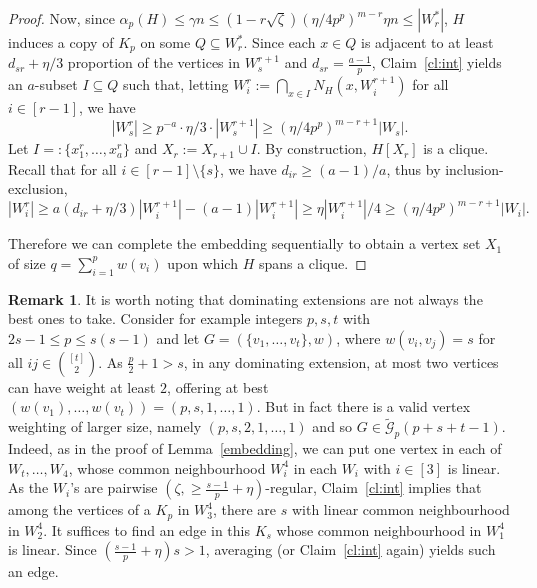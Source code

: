 \documentclass[10pt,a4paper]{article}
\theoremstyle{definition}
\newtheorem{remark}[theorem]{Remark}
\newcommand{\cG}{\mathcal{G}}
\begin{document}
\begin{proof}
	Now, since $\alpha_p(H) \leq \gamma n \leq (1-r\sqrt{\zeta})(\eta/4p^p)^{m-r}\eta n \leq |W^*_r|$, $H$ induces a copy of $K_{p}$ on some $Q\subseteq W_r^*$. Since each $x\in Q$ is adjacent to at least $d_{sr}+\eta/3$ proportion of the vertices in $W_s^{r+1}$ and $d_{sr}=\frac{a-1}{p}$, Claim~\ref{cl:int} yields an $a$-subset $I\subseteq Q$ such that, letting $W_i^r := \bigcap_{x \in I}N_H(x,W_i^{r+1})$ for all $i \in [r-1]$, we have 
	$$|W_s^r| \geq p^{-a}\cdot\eta/3\cdot|W_s^{r+1}| \geq (\eta/4p^p)^{m-r+1}|W_s|.$$
	Let $I =: \lbrace x^r_1,\ldots,x^r_{a}\rbrace$ and $X_r := X_{r+1}\cup I$.
	By construction, $H[X_r]$ is a clique.
	Recall that for all $i \in [r-1]\setminus\lbrace s\rbrace$, we have $d_{ir} \geq (a-1)/a$,
	thus by inclusion-exclusion, 
	$$|W_i^r| \geq a(d_{ir}+\eta/3)|W_i^{r+1}| - (a-1)|W_i^{r+1}| \geq \eta|W_i^{r+1}|/4 \geq (\eta/4p^p)^{m-r+1}|W_i|.$$
	
	Therefore we can complete the embedding sequentially to obtain a vertex set $X_1$ of size $q=\sum_{i=1}^{p}w(v_i)$ upon which $H$ spans a clique.
\end{proof}


\begin{remark}
	It is worth noting that dominating extensions are not always the best ones to take. %
	Consider for example integers $p,s,t$ with $2s-1\le p \leq s(s-1)$ and let $G=(\lbrace v_1,\ldots,v_t\rbrace,w)$, where $w(v_i,v_j)=s$ for all $ij\in{[t]\choose 2}$. As $\frac{p}{2}+1>s$, in any dominating extension, at most two vertices can have weight at least $2$, offering at best $(w(v_1),\ldots,w(v_t)) =(p,s,1,\ldots,1)$. But in fact there is a valid vertex weighting of larger size, namely $(p,s,2,1,\ldots,1)$ and so $G\in \widetilde{\cG}_p(p+s+t-1)$. Indeed, as in the proof of Lemma~\ref{embedding}, we can put one vertex in each of $W_t,\ldots,W_4$, whose common neighbourhood $W_i^4$ in each $W_i$ with $i \in [3]$ is linear. 
	As the $W_i$'s are pairwise $(\zeta,\geq\!\frac{s-1}{p}+\eta)$-regular, Claim~\ref{cl:int} implies that among the vertices of a $K_{p}$ in $W_3^4$, there are $s$ with linear common neighbourhood in $W_2^4$. It suffices to find an edge in this $K_s$ whose common neighbourhood in $W_1^4$ is linear. Since $(\frac{s-1}{p}+\eta)s>1$, averaging (or Claim~\ref{cl:int} again) yields such an edge.
\end{remark}
\end{document}
